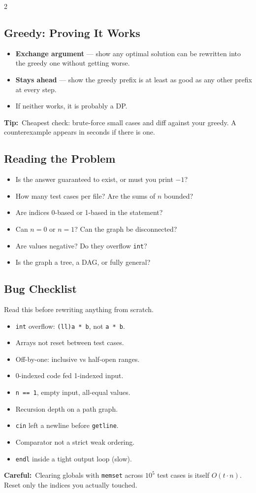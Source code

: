 \documentclass[10pt]{article}
\newcommand{\code}[1]{\texttt{\small #1}}
\newcommand{\tip}[1]{{\color{tipc}\footnotesize\textbf{Tip:}}~{\footnotesize #1}\par}
\newcommand{\warn}[1]{{\color{warnc}\footnotesize\textbf{Careful:}}~{\footnotesize #1}\par}
\begin{document}
\begin{multicols}{2}
\subsection{Greedy: Proving It Works}
\begin{itemize}
    \item \textbf{Exchange argument} --- show any optimal solution can be
          rewritten into the greedy one without getting worse.
    \item \textbf{Stays ahead} --- show the greedy prefix is at least as
          good as any other prefix at every step.
    \item If neither works, it is probably a DP.
\end{itemize}
\tip{Cheapest check: brute-force small cases and diff against your
greedy. A counterexample appears in seconds if there is one.}

\subsection{Reading the Problem}
\begin{itemize}
    \item Is the answer guaranteed to exist, or must you print $-1$?
    \item How many test cases per file? Are the sums of $n$ bounded?
    \item Are indices 0-based or 1-based in the statement?
    \item Can $n = 0$ or $n = 1$? Can the graph be disconnected?
    \item Are values negative? Do they overflow \code{int}?
    \item Is the graph a tree, a DAG, or fully general?
\end{itemize}

\subsection{Bug Checklist}
Read this before rewriting anything from scratch.
\begin{itemize}
    \item \code{int} overflow: \code{(ll)a * b}, not \code{a * b}.
    \item Arrays not reset between test cases.
    \item Off-by-one: inclusive vs half-open ranges.
    \item 0-indexed code fed 1-indexed input.
    \item \code{n == 1}, empty input, all-equal values.
    \item Recursion depth on a path graph.
    \item \code{cin} left a newline before \code{getline}.
    \item Comparator not a strict weak ordering.
    \item \code{endl} inside a tight output loop (slow).
\end{itemize}
\warn{Clearing globals with \code{memset} across $10^5$ test cases is
itself $O(t \cdot n)$. Reset only the indices you actually touched.}


\end{multicols}
\end{document}
